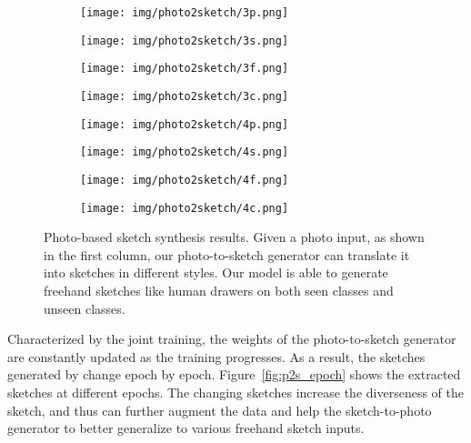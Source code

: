 \documentclass[10pt,twocolumn,letterpaper]{article}
\begin{document}
\begin{figure}[tbp]
\begin{center}
  \begin{subfigure}[b]{\ptswidth\linewidth}
  \texttt{[image: img/photo2sketch/3p.png]}
\end{subfigure}
  \begin{subfigure}[b]{\ptswidth\linewidth}
  \texttt{[image: img/photo2sketch/3s.png]}
\end{subfigure}
\begin{subfigure}[b]{\ptswidth\linewidth}
  \texttt{[image: img/photo2sketch/3f.png]}
\end{subfigure}
  \begin{subfigure}[b]{\ptswidth\linewidth}
  \texttt{[image: img/photo2sketch/3c.png]}
\end{subfigure}
  
  \begin{subfigure}[b]{\ptswidth\linewidth}
  \texttt{[image: img/photo2sketch/4p.png]}
  \end{subfigure}
  \begin{subfigure}[b]{\ptswidth\linewidth}
  \texttt{[image: img/photo2sketch/4s.png]}
  \end{subfigure}
\begin{subfigure}[b]{\ptswidth\linewidth}
  \texttt{[image: img/photo2sketch/4f.png]}
  \end{subfigure}
  \begin{subfigure}[b]{\ptswidth\linewidth}
  \texttt{[image: img/photo2sketch/4c.png]}
  \end{subfigure}
\end{center}
\caption{Photo-based sketch synthesis results. Given a photo input, as shown in the first column, our photo-to-sketch generator can translate it into sketches in different styles. Our model is able to generate freehand sketches like human drawers on both seen classes and unseen classes.}
 \label{fig:photo_to_sketch}
\end{figure}

Characterized by the joint training, the weights of the photo-to-sketch generator are constantly updated as the training progresses. As a result, the sketches generated by  change epoch by epoch. Figure~\ref{fig:p2s_epoch} shows the extracted sketches at different epochs. The changing sketches increase the diverseness of the sketch, and thus can further augment the data and help the sketch-to-photo generator to better generalize to various freehand sketch inputs.
\end{document}
